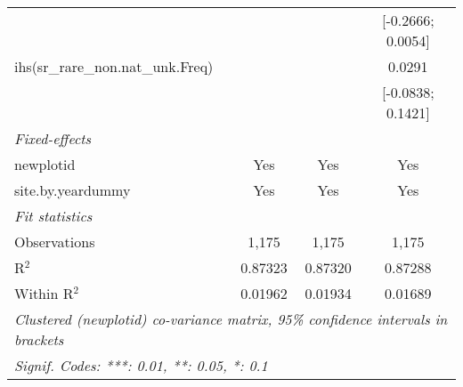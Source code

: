 \begin{table}[htbp]
\begin{tabular}{lccc}
                                              &                    &                    & [-0.2666; 0.0054]\\   
      ihs(sr\_rare\_non.nat\_unk.Freq)        &                    &                    & 0.0291\\   
                                              &                    &                    & [-0.0838; 0.1421]\\   
      \midrule
      \emph{Fixed-effects}\\
      newplotid                               & Yes                & Yes                & Yes\\  
      site.by.yeardummy                       & Yes                & Yes                & Yes\\  
      \midrule
      \emph{Fit statistics}\\
      Observations                            & 1,175              & 1,175              & 1,175\\  
      R$^2$                                   & 0.87323            & 0.87320            & 0.87288\\  
      Within R$^2$                            & 0.01962            & 0.01934            & 0.01689\\  
      \midrule \midrule
      \multicolumn{4}{l}{\emph{Clustered (newplotid) co-variance matrix, 95\% confidence intervals in brackets}}\\
      \multicolumn{4}{l}{\emph{Signif. Codes: ***: 0.01, **: 0.05, *: 0.1}}\\
   \end{tabular}
\end{table}


